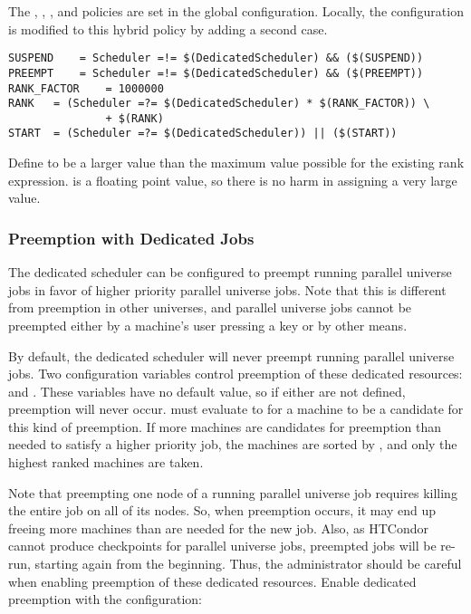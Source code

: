 \begin{description}
The , , , and
 policies are set in the global configuration.
Locally, the configuration is modified to this hybrid policy
by adding a second case.

\begin{verbatim}
SUSPEND    = Scheduler =!= $(DedicatedScheduler) && ($(SUSPEND))
PREEMPT    = Scheduler =!= $(DedicatedScheduler) && ($(PREEMPT))
RANK_FACTOR    = 1000000
RANK   = (Scheduler =?= $(DedicatedScheduler) * $(RANK_FACTOR)) \
               + $(RANK)
START  = (Scheduler =?= $(DedicatedScheduler)) || ($(START))
\end{verbatim}

Define  to be a
larger value than the maximum value possible for the existing rank expression.
\Macro{RANK} is a floating point value, so there is no harm in
assigning a very large value. 

\end{description}

\subsubsection{\label{sec:Configure-Dedicated-Preemption}
Preemption with Dedicated Jobs}

The dedicated scheduler can be configured to preempt running parallel
universe jobs in favor of higher priority parallel universe jobs.
Note that this is
different from preemption in other universes, and parallel universe
jobs cannot
be preempted either by a machine's user pressing a key or by other means.

By default, the dedicated scheduler will never preempt running 
parallel universe jobs.
Two configuration variables control preemption of these dedicated 
resources: 
 and .
These variables have no default value, 
so if either are not defined, preemption will never occur. 
 must evaluate to 
for a machine to be a candidate for this kind of preemption.
If more machines are 
candidates for preemption than needed to satisfy a higher priority job, the
machines are sorted by \MacroNI{SCHEDD\_PREEMPTION\_RANK}, and
only the highest ranked machines are taken.

Note that preempting one node of a running parallel universe job 
requires killing the entire job on all of its nodes.  
So, when preemption occurs, 
it may end up freeing more machines than are needed for the new job.
Also, as HTCondor cannot produce checkpoints for parallel universe jobs,
preempted jobs will be re-run, starting again from the beginning.
Thus, the administrator should be careful when
enabling preemption of these dedicated resources.
Enable dedicated preemption with the configuration:

